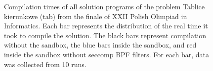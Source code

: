 \documentclass[en]{pracamgr}
\begin{document}
\begin{appendices}
\begin{figure}[H]
\caption{Compilation times of all solution programs of the problem Tablice kierunkowe (tab) from the finale of XXII Polish Olimpiad in Informatics. Each bar represents the distribution of the real time it took to compile the solution. The black bars represent compilation without the sandbox, the blue bars inside the sandbox, and red inside the sandbox without seccomp BPF filters. For each bar, data was collected from 10 runs.}
\label{figure:tab_compilation_real_time}
\end{figure}


\end{appendices}
\end{document}
